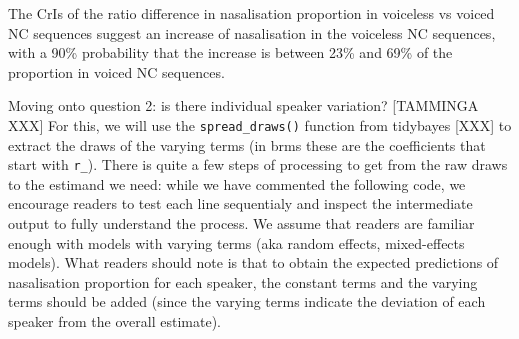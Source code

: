 \documentclass[
  authoryear,
  preprint,
  3p]{elsarticle}
\begin{document}
The CrIs of the ratio difference in nasalisation proportion in voiceless
vs voiced NC sequences suggest an increase of nasalisation in the
voiceless NC sequences, with a 90\% probability that the increase is
between 23\% and 69\% of the proportion in voiced NC sequences.

Moving onto question 2: is there individual speaker variation?
{[}TAMMINGA XXX{]} For this, we will use the \texttt{spread\_draws()}
function from tidybayes {[}XXX{]} to extract the draws of the varying
terms (in brms these are the coefficients that start with \texttt{r\_}).
There is quite a few steps of processing to get from the raw draws to
the estimand we need: while we have commented the following code, we
encourage readers to test each line sequentialy and inspect the
intermediate output to fully understand the process. We assume that
readers are familiar enough with models with varying terms (aka random
effects, mixed-effects models). What readers should note is that to
obtain the expected predictions of nasalisation proportion for each
speaker, the constant terms and the varying terms should be added (since
the varying terms indicate the deviation of each speaker from the
overall estimate).
\end{document}
